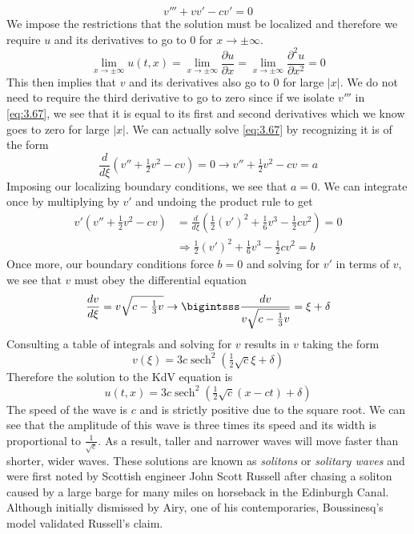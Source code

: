 \documentclass{article}
\newcommand{\pd}[2]{\frac{\partial #1}{\partial #2}}
\newcommand{\od}[2]{\frac{d #1}{d #2}}
\newcommand{\pdt}[2]{\frac{\partial ^2 #1}{\partial #2 ^2}}
\numberwithin{equation}{section}
\begin{document}
\begin{equation}
    v''' + vv'-cv' = 0 \label{eq:3.67}
\end{equation}
We impose the restrictions that the solution must be localized and therefore we require $u$ and its derivatives to go to 0 for $x\rightarrow \pm \infty$. 
\begin{equation}
\lim_{x\rightarrow\pm\infty}u(t,x)=\lim_{x\rightarrow\pm\infty}\pd{u}{x}=\lim_{x\rightarrow\pm\infty}\pdt{u}{x}=0
\end{equation}
This then implies that $v$ and its derivatives also go to 0 for large $|x|$. We do not need to require the third derivative to go to zero since if we isolate $v'''$ in \eqref{eq:3.67}, we see that it is equal to its first and second derivatives which we know goes to zero for large $|x|$. We can actually solve \eqref{eq:3.67} by recognizing it is of the form 
\begin{equation*}
    \od{}{\xi}(v''+\tfrac{1}{2} v^2-cv)=0 \rightarrow v''+\tfrac{1}{2}v^2-cv = a
\end{equation*}
Imposing our localizing boundary conditions, we see that $a=0$. We can integrate once by multiplying by $v'$ and undoing the product rule to get 
\begin{equation}
\begin{split}
    v'(v''+\tfrac{1}{2}v^2-cv) &= \od{}{\xi}\left(\tfrac{1}{2}(v')^2+\tfrac{1}{6}v^3-\tfrac{1}{2}cv^2\right) =0 \\
    &\Rightarrow \tfrac{1}{2}(v')^2+\tfrac{1}{6}v^3-\tfrac{1}{2}cv^2 = b
    \end{split}
\end{equation}
Once more, our boundary conditions force $b=0$ and solving for $v'$ in terms of $v$, we see that $v$ must obey the differential equation 
\begin{equation}
    \od{v}{\xi} =v\sqrt{c-\tfrac{1}{3}v} \rightarrow \bigintsss\frac{dv}{v\sqrt{c-\tfrac{1}{3}v}} = \xi+\delta
\end{equation}
Consulting a table of integrals and solving for $v$ results in $v$ taking the form 
\begin{equation}
    v(\xi) =3c\operatorname{sech}^2(\tfrac{1}{2}\sqrt{c}\xi+\delta)
\end{equation}
Therefore the solution to the KdV equation is 
\begin{equation}
    u(t,x) = 3c\operatorname{sech}^2(\tfrac{1}{2}\sqrt{c}(x-ct)+\delta )
\end{equation}
The speed of the wave is $c$ and is strictly positive due to the square root. We can see that the amplitude of this wave is three times its speed and its width is proportional to $\frac{1}{\sqrt{c}}$. As a result, taller and narrower waves will move faster than shorter, wider waves. These solutions are known as \textit{solitons} or \textit{solitary waves} and were first noted by Scottish engineer John Scott Russell after chasing a soliton caused by a large barge for many miles on horseback in the Edinburgh Canal. Although initially dismissed by Airy, one of his contemporaries, Boussinesq's model validated Russell's claim. \\\\
\end{document}
